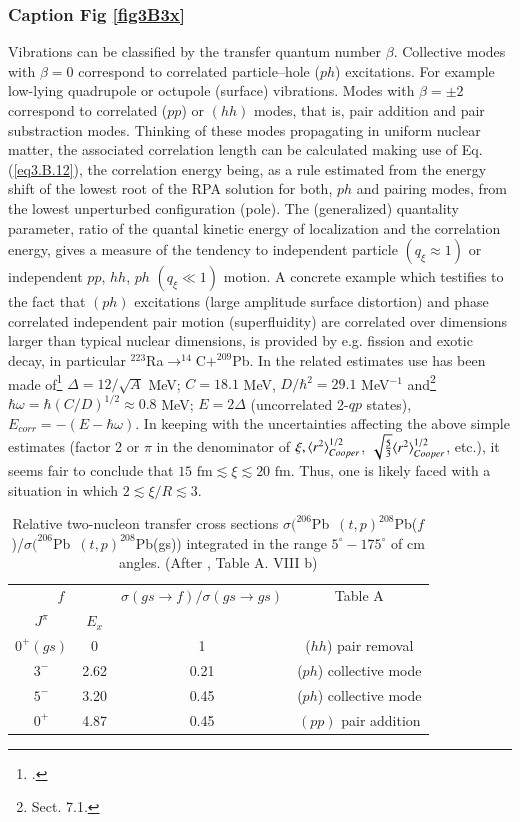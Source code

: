          \subsubsection{Caption Fig \ref{fig3B3x}}
         Vibrations can be classified by the transfer quantum number $\beta$. Collective modes with $\beta=0$ correspond to correlated particle--hole ($ph$) excitations. For example low-lying quadrupole or octupole (surface)  vibrations. Modes with  $\beta=\pm2$  correspond to correlated ($pp$) or $(hh)$ modes, that is, pair addition and pair substraction modes.
         Thinking of these modes propagating in uniform nuclear matter, the associated correlation length can be calculated making use of Eq. (\ref{eq3.B.12}), the correlation energy being, as a rule estimated from the energy shift of the lowest root of the RPA solution for both, $ph$ and pairing modes, from the lowest unperturbed configuration (pole). The (generalized) quantality parameter, ratio of the quantal kinetic energy of localization and the correlation energy,  gives a measure of the tendency to independent particle $(q_\xi\approx1)$ or independent $pp$, $hh$, $ph$ $(q_\xi\ll1)$ motion. A concrete example which testifies to the fact that $(ph)$ excitations (large amplitude surface distortion) and phase correlated independent pair motion (superfluidity) are correlated over dimensions larger than typical nuclear dimensions, is provided by e.g. fission and exotic decay, in particular $^{223}$Ra$\rightarrow^{14}$C$+^{209}$Pb. In the related estimates use has been made of\footnote{\cite{Bohr:69}.} $\Delta=12/\sqrt{A}$ MeV; $C=18.1$ MeV, $D/\hbar^2=29.1$ MeV$^{-1}$ and\footnote{\cite{Brink:05} Sect. 7.1.} $\hbar\omega=\hbar(C/D)^{1/2}\approx0.8$ MeV; $E=2\Delta$ (uncorrelated 2-$qp$ states), $E_{corr}=-(E-\hbar\omega)$. In keeping with the uncertainties affecting the above simple estimates (factor 2 or $\pi$ in the denominator of $\xi,\langle {r^2} \rangle^{1/2}_{Cooper}$,  $\sqrt{\frac{5}{3}}\langle {r^2} \rangle^{1/2}_{Cooper}$, etc.), it seems fair to conclude that $15\text{ fm}\lesssim\xi\lesssim20\text{ fm}$. Thus, one is likely faced with a  situation in which $2\lesssim\xi/R\lesssim3.$
    \begin{table}
    	\begin{tabular}{|c|c|c|c|}
    		\hline
    		\multicolumn{2}{|c|}{$f$} & $\sigma(gs\rightarrow f)/\sigma(gs\rightarrow gs)$ & Table A   \\
    		\cline{1-2}
    		$J^{\pi}$& $E_x$ & & \\
    		\hline
    		$0^+(gs)$ & 0& 1&  ($hh$) pair removal\\
    		\hline
    		$3^-$ & 2.62& 0.21& ($ph$) collective mode\\
    		\hline
    		$5^-$ & 3.20& 0.45& ($ph$) collective mode\\
    		\hline
    		$0^+$ & 4.87& 0.45& $(pp)$ pair addition\\
    		\hline
    	\end{tabular}\caption{Relative two-nucleon transfer cross sections \mbox{$\sigma (^{206}$Pb $(t,p)^{208}$Pb($f$)/$\sigma (^{206}$Pb $(t,p)^{208}$Pb(gs))} integrated in the range $5^\circ-175^\circ$ of cm angles. (After \cite{Broglia:73}, Table A. VIII b)}\label{Tab3.B.1}
    \end{table}
